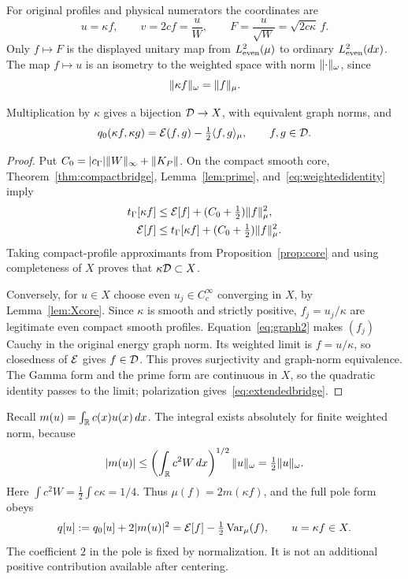 For original profiles and physical numerators the coordinates are
\begin{equation}\label{eq:coordinates}
 u=\kappa f,\qquad v=2cf=\frac uW,\qquad
 F=\frac u{\sqrt W}=\sqrt{2c\kappa}\,f.
\end{equation}
Only $f\mapsto F$ is the displayed unitary map from $L^2_{\mathrm{even}}(\mu)$ to ordinary $L^2_{\mathrm{even}}(dx)$. The map $f\mapsto u$ is an isometry to the weighted space with norm $\lVert\cdot\rVert_\omega$, since
\begin{equation}\label{eq:weightedidentity}
 \lVert\kappa f\rVert_\omega=\lVert f\rVert_\mu.
\end{equation}

\begin{proposition}\label{prop:domain}
Multiplication by $\kappa$ gives a bijection $\mathcal D\to X$, with equivalent graph norms, and
\begin{equation}\label{eq:extendedbridge}
 q_0(\kappa f,\kappa g)=\mathcal E(f,g)-\tfrac12\langle f,g\rangle_\mu,
 \qquad f,g\in\mathcal D.
\end{equation}
\end{proposition}
\begin{proof}
Put $C_0=|c_\Gamma|\lVert W\rVert_\infty+\lVert K_P\rVert$. On the compact smooth core, Theorem~\ref{thm:compactbridge}, Lemma~\ref{lem:prime}, and~\eqref{eq:weightedidentity} imply
\begin{align}
 t_\Gamma[\kappa f]&\le\mathcal E[f]+(C_0+\tfrac12)\lVert f\rVert_\mu^2,\label{eq:graph1}\\
 \mathcal E[f]&\le t_\Gamma[\kappa f]+(C_0+\tfrac12)\lVert f\rVert_\mu^2.\label{eq:graph2}
\end{align}
Taking compact-profile approximants from Proposition~\ref{prop:core} and using completeness of $X$ proves that $\kappa\mathcal D\subset X$.

Conversely, for $u\in X$ choose even $u_j\in C_c^\infty$ converging in $X$, by Lemma~\ref{lem:Xcore}. Since $\kappa$ is smooth and strictly positive, $f_j=u_j/\kappa$ are legitimate even compact smooth profiles. Equation~\eqref{eq:graph2} makes $(f_j)$ Cauchy in the original energy graph norm. Its weighted limit is $f=u/\kappa$, so closedness of $\mathcal E$ gives $f\in\mathcal D$. This proves surjectivity and graph-norm equivalence. The Gamma form and the prime form are continuous in $X$, so the quadratic identity passes to the limit; polarization gives~\eqref{eq:extendedbridge}.
\end{proof}

Recall $m(u)=\int_\mathbb R c(x)u(x)\,dx$. The integral exists absolutely for finite weighted norm, because
\begin{equation}\label{eq:meanbound}
 |m(u)|\le\left(\int_\mathbb R c^2W\,dx\right)^{1/2}\lVert u\rVert_\omega
       =\tfrac12\lVert u\rVert_\omega.
\end{equation}
Here $\int c^2W=\tfrac12\int c\kappa=1/4$. Thus $\mu(f)=2m(\kappa f)$, and the full pole form obeys
\begin{equation}\label{eq:polebridge}
 q[u]:=q_0[u]+2|m(u)|^2
       =\mathcal E[f]-\tfrac12\operatorname{Var}_\mu(f),\qquad u=\kappa f\in X.
\end{equation}
The coefficient $2$ in the pole is fixed by normalization. It is not an additional positive contribution available after centering.


